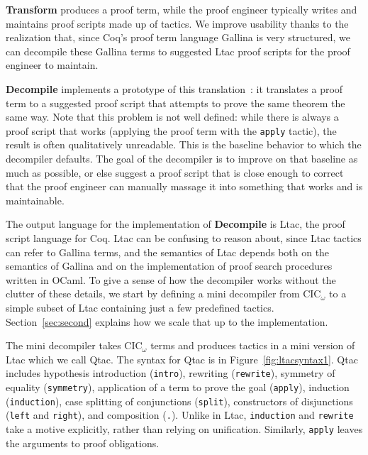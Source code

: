 \textbf{Transform} produces a proof term,
while the proof engineer typically writes and maintains proof scripts made up of tactics.
We improve usability thanks to the realization that, since Coq's proof term language Gallina is very structured,
we can decompile these Gallina terms to suggested Ltac proof scripts for the proof engineer to maintain.


\textbf{Decompile} implements a prototype of this translation~: %
it translates a proof term to a suggested proof script that attempts to prove the same theorem the same way.
Note that this problem is not well defined: while there is always a proof script that 
works (applying the proof term with the \lstinline{apply} tactic), the result is often qualitatively unreadable.
This is the baseline behavior to which the decompiler defaults.
The goal of the decompiler is to improve on that baseline as much as possible,
or else suggest a proof script that is close enough to correct that the proof engineer can
manually massage it into something that works and is maintainable.

The output language for the implementation of \textbf{Decompile} is Ltac, the proof script language for Coq.
Ltac can be confusing to reason about, since Ltac tactics can refer to Gallina terms, and the semantics of Ltac depends both on the
semantics of Gallina and on the implementation of proof search procedures written in OCaml.
To give a sense of how the decompiler works without the clutter of these details, we start by defining a mini
decompiler from CIC$_{\omega}$ to a simple subset of Ltac containing just a few predefined tactics.
Section~\ref{sec:second} explains how we scale that up to the implementation. %

The mini decompiler takes CIC$_{\omega}$ terms and produces tactics in a mini version of Ltac which we call Qtac.
The syntax for Qtac is in Figure~\ref{fig:ltacsyntax1}.
Qtac includes hypothesis introduction (\lstinline{intro}),
rewriting (\lstinline{rewrite}), symmetry of equality (\lstinline{symmetry}),
application of a term to prove the goal (\lstinline{apply}), induction (\lstinline{induction}),
case splitting of conjunctions (\lstinline{split}),
constructors of disjunctions (\lstinline{left} and \lstinline{right}), and
composition (\lstinline{.}).
Unlike in Ltac, \lstinline{induction} and \lstinline{rewrite} take a motive explicitly, rather than relying on unification.
Similarly, \lstinline{apply} leaves the arguments to proof obligations.

